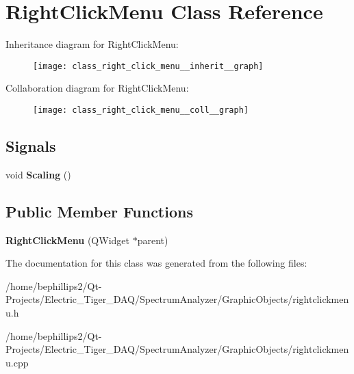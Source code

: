 \hypertarget{class_right_click_menu}{}\section{Right\+Click\+Menu Class Reference}
\label{class_right_click_menu}


Inheritance diagram for Right\+Click\+Menu\+:\nopagebreak
\begin{figure}[H]
\begin{center}
\leavevmode
\texttt{[image: class\_right\_click\_menu\_\_inherit\_\_graph]}
\end{center}
\end{figure}


Collaboration diagram for Right\+Click\+Menu\+:\nopagebreak
\begin{figure}[H]
\begin{center}
\leavevmode
\texttt{[image: class\_right\_click\_menu\_\_coll\_\_graph]}
\end{center}
\end{figure}
\subsection*{Signals}
\begin{DoxyCompactItemize}
\item 
void {\bfseries Scaling} ()\hypertarget{class_right_click_menu_a5607dbc6616a76b431cd77ce47d6a1ee}{}\label{class_right_click_menu_a5607dbc6616a76b431cd77ce47d6a1ee}

\end{DoxyCompactItemize}
\subsection*{Public Member Functions}
\begin{DoxyCompactItemize}
\item 
{\bfseries Right\+Click\+Menu} (Q\+Widget $\ast$parent)\hypertarget{class_right_click_menu_afa4f52467f82c6d5de54999ba037428f}{}\label{class_right_click_menu_afa4f52467f82c6d5de54999ba037428f}

\end{DoxyCompactItemize}


The documentation for this class was generated from the following files\+:\begin{DoxyCompactItemize}
\item 
/home/bephillips2/\+Qt-\/\+Projects/\+Electric\+\_\+\+Tiger\+\_\+\+D\+A\+Q/\+Spectrum\+Analyzer/\+Graphic\+Objects/rightclickmenu.\+h\item 
/home/bephillips2/\+Qt-\/\+Projects/\+Electric\+\_\+\+Tiger\+\_\+\+D\+A\+Q/\+Spectrum\+Analyzer/\+Graphic\+Objects/rightclickmenu.\+cpp\end{DoxyCompactItemize}
